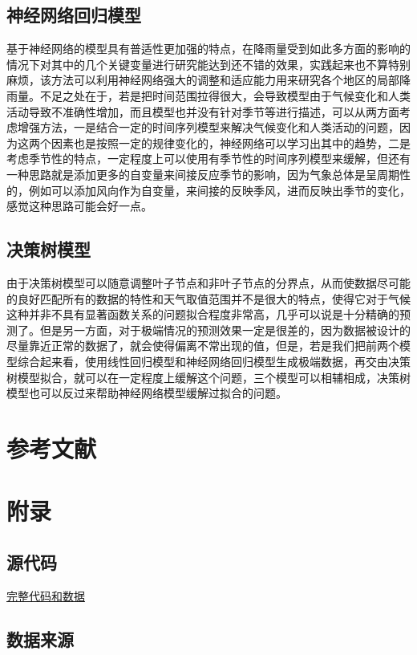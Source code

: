\documentclass[UTF8, a4paper]{ctexart}
\begin{document}
\subsection{神经网络回归模型}
基于神经网络的模型具有普适性更加强的特点，在降雨量受到如此多方面的影响的情况下对其中的几个关键变量进行研究能达到还不错的效果，实践起来也不算特别麻烦，该方法可以利用神经网络强大的调整和适应能力用来研究各个地区的局部降雨量。不足之处在于，若是把时间范围拉得很大，会导致模型由于气候变化和人类活动导致不准确性增加，而且模型也并没有针对季节等进行描述，可以从两方面考虑增强方法，一是结合一定的时间序列模型来解决气候变化和人类活动的问题，因为这两个因素也是按照一定的规律变化的，神经网络可以学习出其中的趋势，二是考虑季节性的特点，一定程度上可以使用有季节性的时间序列模型来缓解，但还有一种思路就是添加更多的自变量来间接反应季节的影响，因为气象总体是呈周期性的，例如可以添加风向作为自变量，来间接的反映季风，进而反映出季节的变化，感觉这种思路可能会好一点。

\subsection{决策树模型}
由于决策树模型可以随意调整叶子节点和非叶子节点的分界点，从而使数据尽可能的良好匹配所有的数据的特性和天气取值范围并不是很大的特点，使得它对于气候这种并非不具有显著函数关系的问题拟合程度非常高，几乎可以说是十分精确的预测了。但是另一方面，对于极端情况的预测效果一定是很差的，因为数据被设计的尽量靠近正常的数据了，就会使得偏离不常出现的值，但是，若是我们把前两个模型综合起来看，使用线性回归模型和神经网络回归模型生成极端数据，再交由决策树模型拟合，就可以在一定程度上缓解这个问题，三个模型可以相辅相成，决策树模型也可以反过来帮助神经网络模型缓解过拟合的问题。

\section{参考文献}


\appendix
\setcounter{secnumdepth}{-2}
\section{附录}

\setcounter{secnumdepth}{3}
\subsection{源代码}

\href{https://github.com/limuy2022/math_model}{完整代码和数据}

\subsection{数据来源}
\end{document}
